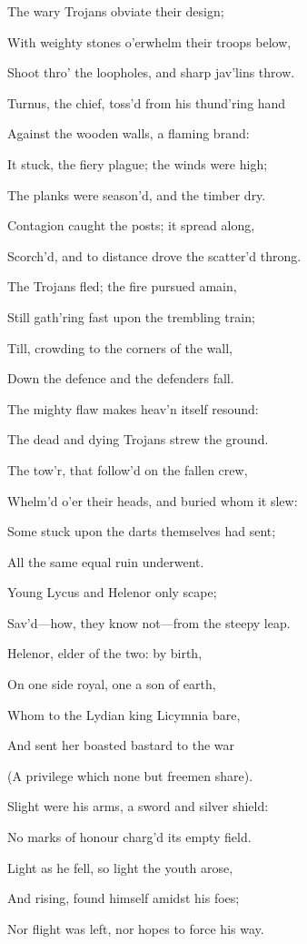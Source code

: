 The wary Trojans obviate their design;

With weighty stones o’erwhelm their troops below,

Shoot thro’ the loopholes, and sharp jav’lins throw.

Turnus, the chief, toss’d from his thund’ring hand

Against the wooden walls, a flaming brand:

It stuck, the fiery plague; the winds were high;

The planks were season’d, and the timber dry.

Contagion caught the posts; it spread along,

Scorch’d, and to distance drove the scatter’d throng.

The Trojans fled; the fire pursued amain,

Still gath’ring fast upon the trembling train;

Till, crowding to the corners of the wall,

Down the defence and the defenders fall.

The mighty flaw makes heav’n itself resound:

The dead and dying Trojans strew the ground.

The tow’r, that follow’d on the fallen crew,

Whelm’d o’er their heads, and buried whom it slew:

Some stuck upon the darts themselves had sent;

All the same equal ruin underwent.

Young Lycus and Helenor only scape;

Sav’d—how, they know not—from the steepy leap.

Helenor, elder of the two: by birth,

On one side royal, one a son of earth,

Whom to the Lydian king Licymnia bare,

And sent her boasted bastard to the war

(A privilege which none but freemen share).

Slight were his arms, a sword and silver shield:

No marks of honour charg’d its empty field.

Light as he fell, so light the youth arose,

And rising, found himself amidst his foes;

Nor flight was left, nor hopes to force his way.

